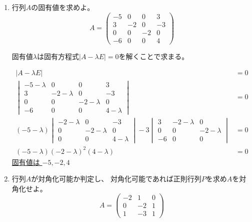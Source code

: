 \documentclass[10pt,b5paper]{ltjsarticle}
\begin{document}
\begin{enumerate}
 \item %
       行列$A$の固有値を求めよ。
       \begin{equation}
        A=\left(
           \begin{matrix}
            -5 & 0 & 0 & 3\\
            3 & -2 & 0 & -3\\
            0 & 0 & -2 & 0\\
            -6 & 0 & 0 & 4
           \end{matrix}
         \right)
       \end{equation}

       \dotfill

       固有値$\lambda$は固有方程式$\lvert A-\lambda E \rvert =0$を解くことで求まる。

       \dotfill

       \begin{align}
        \lvert A-\lambda E \rvert &= 0\\
        \begin{vmatrix}
            -5 -\lambda & 0 & 0 & 3\\
            3 & -2 -\lambda & 0 & -3\\
            0 & 0 & -2 -\lambda & 0\\
            -6 & 0 & 0 & 4 -\lambda
        \end{vmatrix}
        &=0\\
        (-5-\lambda)
        \begin{vmatrix}
            -2 -\lambda & 0 & -3\\
            0 & -2 -\lambda & 0\\
            0 & 0 & 4 -\lambda
        \end{vmatrix}
        -3
        \begin{vmatrix}
            3 & -2 -\lambda & 0\\
            0 & 0 & -2 -\lambda\\
            -6 & 0 & 0
        \end{vmatrix}
        &=0\\
        (-5-\lambda)(-2-\lambda)^2(4-\lambda)&=0
       \end{align}
       \underline{固有値は $-5, -2, 4$}

       \hrulefill
 \item 行列$A$が対角化可能か判定し、
       対角化可能であれば正則行列$P$を求め$A$を対角化せよ。
       \begin{equation}
        A=\left(
           \begin{matrix}
            -2 & 1 & 0\\
            0 & -2 & 1\\
            1 & -3 & 1
           \end{matrix}
         \right)
       \end{equation}


\end{enumerate}
\end{document}
